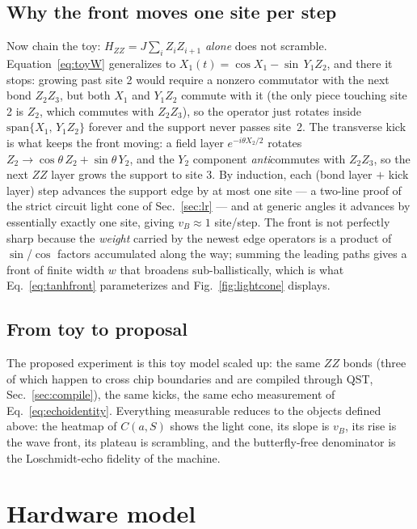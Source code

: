 \documentclass[11pt]{article}
\begin{document}
\subsection{Why the front moves one site per step}

Now chain the toy: $H_{ZZ} = J\sum_i Z_iZ_{i+1}$ \emph{alone} does not
scramble. Equation~\eqref{eq:toyW} generalizes to
$X_1(t) = \cos X_1 - \sin\, Y_1Z_2$, and there it stops: growing past site 2
would require a nonzero commutator with the next bond $Z_2Z_3$, but both
$X_1$ and $Y_1Z_2$ commute with it (the only piece touching site 2 is
$Z_2$, which commutes with $Z_2Z_3$), so the operator just rotates inside
$\mathrm{span}\{X_1,\, Y_1Z_2\}$ forever and the support never passes
site~2. The transverse kick is what keeps the front moving: a field layer
$e^{-i\theta X_2/2}$ rotates $Z_2 \to \cos\theta\, Z_2 + \sin\theta\, Y_2$,
and the $Y_2$ component \emph{anti}commutes with $Z_2Z_3$, so the next $ZZ$
layer grows the support to site 3. By induction, each (bond layer $+$ kick
layer) step advances the support edge by at most one site --- a two-line
proof of the strict circuit light cone of Sec.~\ref{sec:lr} --- and at
generic angles it advances by essentially exactly one site, giving
$v_B \approx 1$ site/step. The front is not perfectly sharp because the
\emph{weight} carried by the newest edge operators is a product of
$\sin$/$\cos$ factors accumulated along the way; summing the leading paths
gives a front of finite width $w$ that broadens sub-ballistically, which is
what Eq.~\eqref{eq:tanhfront} parameterizes and Fig.~\ref{fig:lightcone}
displays.

\subsection{From toy to proposal}

The proposed experiment is this toy model scaled up: the same $ZZ$ bonds
(three of which happen to cross chip boundaries and are compiled through QST,
Sec.~\ref{sec:compile}), the same kicks, the same echo measurement of
Eq.~\eqref{eq:echoidentity}. Everything measurable reduces to the objects
defined above: the heatmap of $C(a,S)$ shows the light cone, its slope is
$v_B$, its rise is the wave front, its plateau is scrambling, and the
butterfly-free denominator is the Loschmidt-echo fidelity of the machine.

\section{Hardware model}
\end{document}
